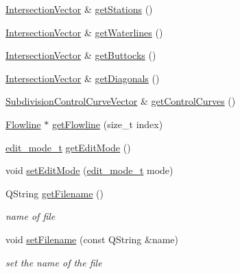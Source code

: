 \begin{DoxyCompactItemize}
\item 
\hyperlink{namespaceShipCAD_a9910f0963197f9df6125398efd4fa139}{Intersection\-Vector} \& \hyperlink{classShipCAD_1_1ShipCADModel_a86da3ca66e90403ead21ccc67f584c52}{get\-Stations} ()
\item 
\hyperlink{namespaceShipCAD_a9910f0963197f9df6125398efd4fa139}{Intersection\-Vector} \& \hyperlink{classShipCAD_1_1ShipCADModel_a6c147a75fa02e43145de346efb9542fd}{get\-Waterlines} ()
\item 
\hyperlink{namespaceShipCAD_a9910f0963197f9df6125398efd4fa139}{Intersection\-Vector} \& \hyperlink{classShipCAD_1_1ShipCADModel_a8908d7adff0b1aa1ed118103c02c5402}{get\-Buttocks} ()
\item 
\hyperlink{namespaceShipCAD_a9910f0963197f9df6125398efd4fa139}{Intersection\-Vector} \& \hyperlink{classShipCAD_1_1ShipCADModel_a19864f7628c596553f7c89247715b10a}{get\-Diagonals} ()
\item 
\hyperlink{namespaceShipCAD_aa9dd7a826ae5254e377dac43ea19da80}{Subdivision\-Control\-Curve\-Vector} \& \hyperlink{classShipCAD_1_1ShipCADModel_ac631aaf60a936bb5b22bcab59cb7d6a4}{get\-Control\-Curves} ()
\item 
\hyperlink{classShipCAD_1_1Flowline}{Flowline} $\ast$ \hyperlink{classShipCAD_1_1ShipCADModel_afc5654f671a17dd6672230648842975e}{get\-Flowline} (size\-\_\-t index)
\item 
\hyperlink{namespaceShipCAD_a66144e3f3a53da01f51c9bdb94fcae31}{edit\-\_\-mode\-\_\-t} \hyperlink{classShipCAD_1_1ShipCADModel_a355525c21cd0a9a4a88846b5587a236c}{get\-Edit\-Mode} ()
\item 
void \hyperlink{classShipCAD_1_1ShipCADModel_a2636160d900b8d8b00802ae78ee87925}{set\-Edit\-Mode} (\hyperlink{namespaceShipCAD_a66144e3f3a53da01f51c9bdb94fcae31}{edit\-\_\-mode\-\_\-t} mode)
\item 
Q\-String \hyperlink{classShipCAD_1_1ShipCADModel_a7cdd359f050f81975d1992a7d161ce87}{get\-Filename} ()
\begin{DoxyCompactList}\small\item\em name of file \end{DoxyCompactList}\item 
void \hyperlink{classShipCAD_1_1ShipCADModel_a07daf75d876f80296f841f5c8d2327cb}{set\-Filename} (const Q\-String \&name)
\begin{DoxyCompactList}\small\item\em set the name of the file \end{DoxyCompactList}\item 

\end{DoxyCompactItemize}
